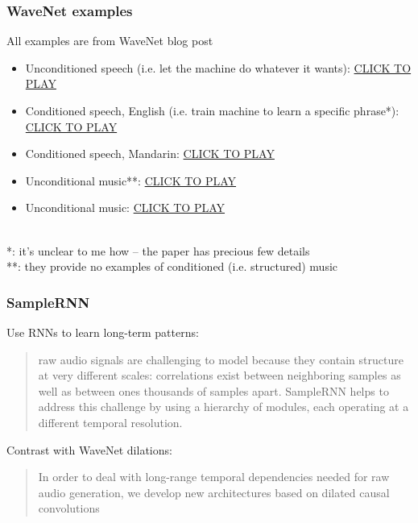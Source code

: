 \documentclass{beamer}
\begin{document}

\begin{frame}
	\frametitle{WaveNet examples}
	All examples are from WaveNet blog post
	\begin{itemize}
		\item
			Unconditioned speech (i.e. let the machine do whatever it wants): \href{run:./wavenet_speech_unconditional.wav}{CLICK TO PLAY}
		\item
			Conditioned speech, English (i.e. train machine to learn a specific phrase*): \href{run:./wavenet_speech_conditioned_english.wav}{CLICK TO PLAY}
		\item
			Conditioned speech, Mandarin: \href{run:./wavenet_speech_conditioned_mandarin.wav}{CLICK TO PLAY}
		\item
			Unconditional music**: \href{run:./wavenet_sample_1.wav}{CLICK TO PLAY}
		\item
			Unconditional music: \href{run:./wavenet_sample_2.wav}{CLICK TO PLAY}
	\end{itemize}\ \\
	\vspace{1em}
	*: it's unclear to me how -- the paper has precious few details\\
	**: they provide no examples of conditioned (i.e. structured) music
\end{frame}

\begin{frame}
	\frametitle{SampleRNN}
	Use RNNs to learn long-term patterns:\\
	\begin{quote}
		raw audio signals are challenging to model because they contain structure at very different scales: correlations exist between neighboring samples as well as between ones thousands of samples apart. SampleRNN helps to address this challenge by using a hierarchy of modules, each operating at a different temporal resolution.
	\end{quote}
	Contrast with WaveNet dilations:
	\begin{quote}
		In order to deal with long-range temporal dependencies needed for raw audio generation, we develop new architectures based on dilated causal convolutions
	\end{quote}
\end{frame}
\end{document}

